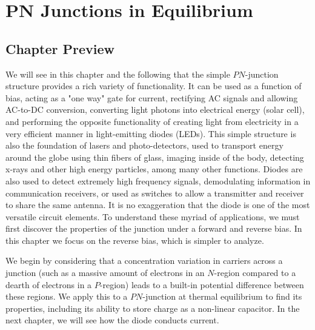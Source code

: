 \chapter{PN Junctions in Equilibrium}
\label{ch:ch05_pn_junc}
\graphicspath{{./figs_pn_junc/}}
\section{Chapter Preview}
We will see in this chapter and the following that the simple $PN$-junction structure provides a rich variety of functionality.  It can be used as a function of bias, acting as a "one way" gate for current, rectifying AC signals and allowing AC-to-DC conversion, converting light photons into electrical energy (solar cell), and performing the opposite functionality of creating light from electricity in a very efficient manner in light-emitting diodes (LEDs).  This simple structure is also the foundation of lasers and photo-detectors, used to transport energy around the globe using thin fibers of glass, imaging inside of the body, detecting x-rays and other high energy particles, among many other functions.  Diodes are also used to detect extremely high frequency signals, demodulating information in communication receivers, or used as switches to allow a transmitter and receiver to share the same antenna.  It is no exaggeration that the diode is one of the most versatile circuit elements.  To understand these myriad of applications, we must first discover the properties of the junction under a forward and reverse bias.  In this chapter we focus on the reverse bias, which is simpler to analyze.

We begin by considering that a concentration variation in carriers across a junction (such as a massive amount of electrons in an $N$-region compared to a dearth of electrons in a $P$-region) leads to a built-in potential difference between these regions.  We apply this to a $PN$-junction at thermal equilibrium to find its properties, including its ability to store charge as a non-linear capacitor.  In the next chapter, we will see how the diode conducts current.
\newpage
